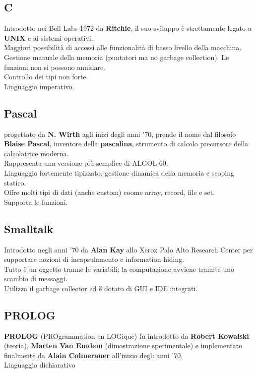 \documentclass[12pt,a4paper]{article}
\begin{document}
\subsection{C}
Introdotto nei Bell Labs 1972 da \textbf{Ritchie}, il suo sviluppo è strettamente legato a \textbf{UNIX} e ai sistemi operativi.\\
Maggiori possibilità di accessi alle funzionalità di basso livello della macchina.\\
Gestione manuale della memoria (puntatori ma no garbage collection). Le funzioni non si possono annidare.\\
Controllo dei tipi non forte.\\
Linguaggio imperativo.

\subsection{Pascal}
progettato da \textbf{N. Wirth} agli inizi degli anni '70, prende il nome dal filosofo \textbf{Blaise Pascal}, inventore della \textbf{pascalina}, strumento di calcolo precursore della calcolatrice moderna.\\
Rappresenta una versione più semplice di ALGOL 60.\\
Linguaggio fortemente tipizzato, gestione dinamica della memoria e scoping statico.\\
Offre molti tipi di dati (anche custom) coome array, record, file e set.\\
Supporta le funzioni.

\subsection{Smalltalk}
Introdotto negli anni '70 da \textbf{Alan Kay} allo Xerox Palo Alto Research Center per supportare nozioni di incapsulamento e information hiding.\\
Tutto è un oggetto tranne le variabili; la computazione avviene tramite uno scambio di messaggi.\\
Utilizza il garbage collector ed è dotato di GUI e IDE integrati.

\subsection{PROLOG}
\textbf{PROLOG} (PROgrammation en LOGique) fu introdotto da \textbf{Robert Kowalski} (teoria), \textbf{Marten Van Emdem} (dimostrazione sperimentale) e implementato finalmente da \textbf{Alain Colmerauer} all'inizio degli anni '70.\\
Linguaggio dichiarativo
\end{document}

